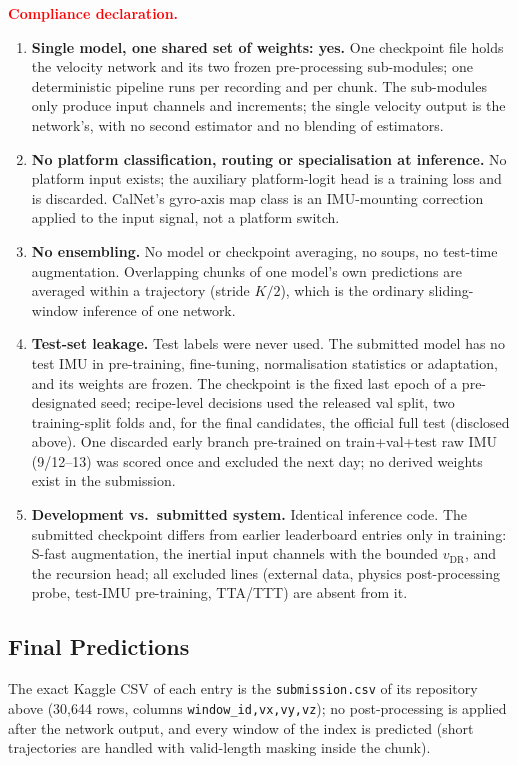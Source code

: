 \documentclass[letterpaper,10pt,conference]{ieeeconf}
\newcommand{\vdr}{v_{\mathrm{DR}}}
\begin{document}
\noindent\textcolor{red}{\textbf{Compliance declaration.}}
\begin{enumerate}
\item \textbf{Single model, one shared set of weights: yes.} One checkpoint file holds the velocity
network and its two frozen pre-processing sub-modules; one deterministic pipeline runs per
recording and per chunk. The sub-modules only produce input channels and increments; the single
velocity output is the network's, with no second estimator and no blending of estimators.
\item \textbf{No platform classification, routing or specialisation at inference.} No platform
input exists; the auxiliary platform-logit head is a training loss and is discarded. CalNet's
gyro-axis map class is an IMU-mounting correction applied to the input signal, not a platform switch.
\item \textbf{No ensembling.} No model or checkpoint averaging, no soups, no test-time augmentation.
Overlapping chunks of one model's own predictions are averaged within a trajectory (stride $K/2$),
which is the ordinary sliding-window inference of one network.
\item \textbf{Test-set leakage.} Test labels were never used. The submitted model has no test IMU in
pre-training, fine-tuning, normalisation statistics or adaptation, and its weights are frozen. The
checkpoint is the fixed last epoch of a pre-designated seed; recipe-level decisions used the
released val split, two training-split folds and, for the final candidates, the official full test
(disclosed above). One discarded early branch pre-trained on train+val+test raw IMU (9/12--13) was
scored once and excluded the next day; no derived weights exist in the submission.
\item \textbf{Development vs.\ submitted system.} Identical inference code. The submitted checkpoint
differs from earlier leaderboard entries only in training: S-fast augmentation, the inertial input
channels with the bounded $\vdr$, and the recursion head; all excluded lines (external data,
physics post-processing probe, test-IMU pre-training, TTA/TTT) are absent from it.
\end{enumerate}

\subsection{Final Predictions}
The exact Kaggle CSV of each entry is the \texttt{submission.csv} of its repository above
(30,644 rows, columns \texttt{window\_id,vx,vy,vz}); no post-processing is applied after the network
output, and every window of the index is predicted (short trajectories are handled with valid-length
masking inside the chunk).
\end{document}
